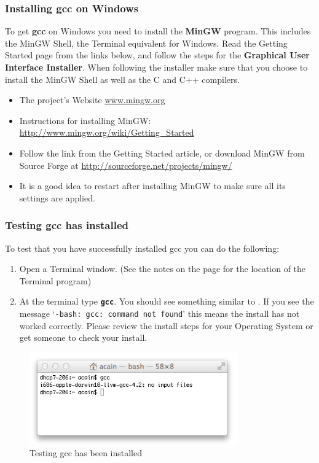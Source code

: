 
\subsubsection{Installing gcc on Windows} %
\label{ssub:installing_gcc_on_windows}

To get \textbf{gcc} on Windows you need to install the \textbf{MinGW} program. This includes the MinGW Shell, the Terminal equivalent for Windows. Read the Getting Started page from the links below, and follow the steps for the \textbf{Graphical User Interface Installer}. When following the installer make sure that you choose to install the MinGW Shell as well as the C and C++ compilers.

\begin{itemize}
  \item The project's Website \url{www.mingw.org}
  \item Instructions for installing MinGW: \url{http://www.mingw.org/wiki/Getting_Started}
  \item Follow the link from the Getting Started article, or download MinGW from Source Forge at \url{http://sourceforge.net/projects/mingw/}
  \item It is a good idea to restart after installing MinGW to make sure all its settings are applied.
\end{itemize}

\clearpage
\subsubsection{Testing gcc has installed} %
\label{ssub:testing_your_install}

To test that you have successfully installed gcc you can do the following:
\begin{enumerate}
  \item Open a Terminal window. (See the notes on the  page for the location of the Terminal program)
  \item At the terminal type \textbf{\texttt{gcc}}. You should see something similar to . If you see the message `\texttt{-bash: gcc: command not found}' this means the install has not worked correctly. Please review the install steps for your Operating System or get someone to check your install.
\end{enumerate}

\begin{figure}[h]
   \centering
   \includegraphics[width=0.8\textwidth]{./topics/programs-and-compilers/images/gccInstall} 
   \caption{Testing gcc has been installed}
   \label{fig:gcc-install}
\end{figure}


